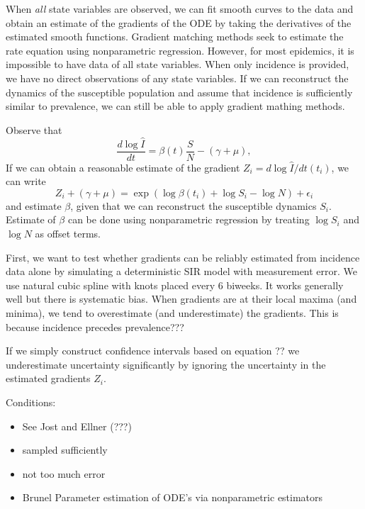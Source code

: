 \documentclass{article}
\begin{document}
When \emph{all} state variables are observed, we can fit smooth curves to the data and obtain an estimate of the gradients of the ODE by taking the derivatives of the estimated smooth functions.
Gradient matching methods seek to estimate the rate equation using nonparametric regression.
However, for most epidemics, it is impossible to have data of all state variables.
When only incidence is provided, we have no direct observations of any state variables. 
If we can reconstruct the dynamics of the susceptible population and assume that incidence is sufficiently similar to prevalence, we can still be able to apply gradient mathing methods.

Observe that
\begin{equation}
\frac{d \log\hat{I}}{dt} = \beta(t) \frac{S}{N} - (\gamma + \mu),
\end{equation}
If we can obtain a reasonable estimate of the gradient $Z_i = d \log \hat{I}/dt (t_i)$, we can write
\begin{equation}
Z_i + (\gamma + \mu) = \exp \left(\log \beta (t_i) + \log S_i - \log N \right)  + \epsilon_i
\end{equation}
and estimate $\beta$, given that we can reconstruct the susceptible dynamics $S_i$.
Estimate of $\beta$ can be done using nonparametric regression by treating $\log S_i$ and $\log N$ as offset terms.

First, we want to test whether gradients can be reliably estimated from incidence data alone by simulating a deterministic SIR model with measurement error.
We use natural cubic spline with knots placed every 6 biweeks.
It works generally well but there is systematic bias.
When gradients are at their local maxima (and minima), we tend to overestimate (and underestimate) the gradients.
This is because incidence precedes prevalence???

If we simply construct confidence intervals based on equation ?? we underestimate uncertainty significantly by ignoring the uncertainty in the estimated gradients $Z_i$.

Conditions:
\begin{itemize}
	\item See Jost and Ellner (???)
	\item sampled sufficiently
	\item not too much error
	\item Brunel Parameter estimation of ODE’s via nonparametric estimators
\end{itemize}


\end{document}
